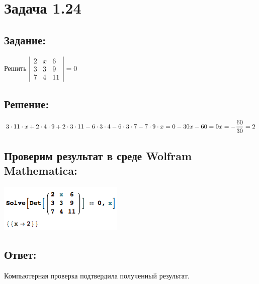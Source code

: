 \section{Задача 1.24}
\subsection{Задание:}
Решить
$
	\left|
		\begin{matrix}
			2 & x & 6 \\
			3 & 3 & 9 \\
			7 & 4 & 11
		\end{matrix}
	\right|
	= 0
$
\subsection{Решение:}
$
	3 \cdot 11 \cdot x + 2 \cdot 4 \cdot 9 + 2 \cdot 3 \cdot 11 -
	6 \cdot 3 \cdot 4 - 6 \cdot 3 \cdot 7 - 7 \cdot 9 \cdot x = 0
	\\[1ex]
	-30x - 60 = 0
	\\[1ex]
	x = -\dfrac{60}{30} = 2
$
\subsection{Проверим результат в среде Wolfram Mathematica:}
\includegraphics[scale=0.6]{task/1_24/screen.png}
\subsection{Ответ:}
Компьютерная проверка подтвердила полученный результат.
